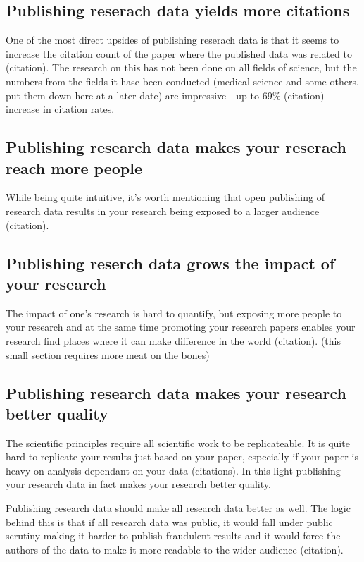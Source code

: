 \subsection{Publishing reserach data yields more citations}

One of the most direct upsides of publishing reserach data is that it seems to
increase the citation count of the paper where the published data was related
to (citation). The research on this has not been done on all fields of science,
but the numbers from the fields it hase been conducted (medical science and
some others, put them down here at a later date) are impressive - up to
69\% (citation) increase in citation rates.

\subsection{Publishing research data makes your reserach reach more people}

While being quite intuitive, it's worth mentioning that open publishing of
research data results in your research being exposed to a larger audience
(citation).

\subsection{Publishing reserch data grows the impact of your research}

The impact of one's research is hard to quantify, but exposing more people to
your research and at the same time promoting your research papers enables your
research find places where it can make difference in the world (citation).
(this small section requires more meat on the bones)

\subsection{Publishing research data makes your research better quality}

The scientific principles require all scientific work to be replicateable. It
is quite hard to replicate your results just based on your paper, especially if
your paper is heavy on analysis dependant on your data (citations). In this
light publishing your research data in fact makes your research better quality.

Publishing research data should make all research data better as well. The
logic behind this is that if all research data was public, it would fall under
public scrutiny making it harder to publish fraudulent results and it would
force the authors of the data to make it more readable to the wider audience
(citation).

